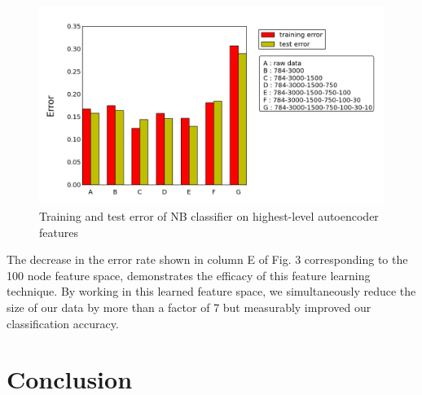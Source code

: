 \documentclass{article}
\begin{document}
\begin{figure}[htbp!]
    \centering
    \includegraphics[width=\textwidth]{trainingAndTestError.png}
    \caption{Training and test error of NB classifier on highest-level autoencoder features}
    \label{fig:error}
\end{figure}%

The decrease in the error rate shown in column E of Fig. 3 corresponding to the 100 node feature space, demonstrates the efficacy of this feature learning technique. By working in this learned feature space, we simultaneously reduce the size of our data by more than a factor of 7 but measurably improved our classification accuracy. 

\section{Conclusion}\label{sec:conclusion}

\nocite{*}
{}

\end{document}
